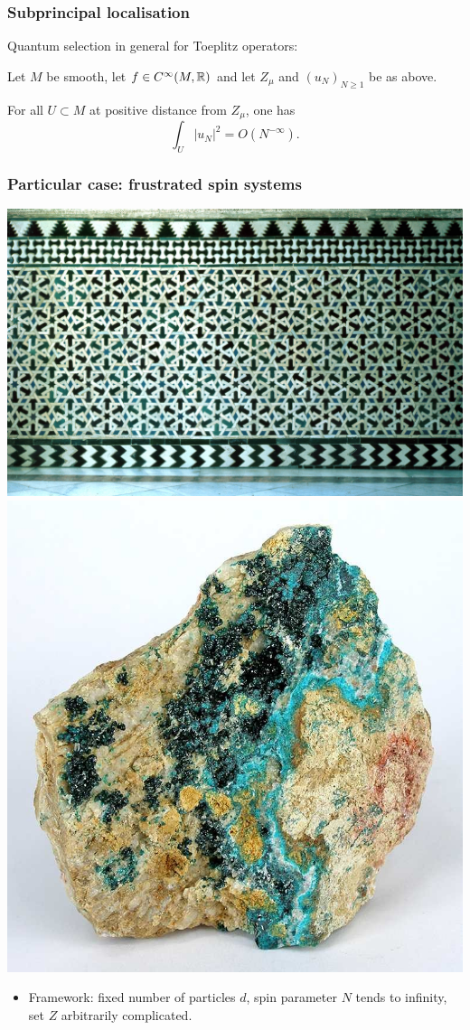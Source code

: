 \documentclass[mathserif]{beamer}
\newcommand{\mycite}[1]{{\color{mygreen} \small #1}}
\begin{document}
\begin{frame}
  \frametitle{Subprincipal localisation}
  Quantum selection in general for Toeplitz operators:
  \begin{theorem}[\mycite{[\underline{D. 2020a}]}]
    Let $M$ be smooth, let $f\in C^{\infty}(M,\mathbb{R})$ and let $Z_{\mu}$ and
    $(u_N)_{N\geq 1}$ be as above.

    For all $U\subset M$ at positive distance from $Z_{\mu}$, one has
    \[
      \int_U
      |u_N|^2=O(N^{-\infty}).
      \]
  \end{theorem}
\end{frame}

\begin{frame}
  \frametitle{Particular case: frustrated spin systems}
  \begin{center}
    \includegraphics[scale=6]{Alcazar.png}\includegraphics[scale=0.16]{Herbertsmithite.jpg}
  \end{center}
  \begin{itemize}
\item  Framework: fixed number of particles $d$, spin parameter $N$
  tends to infinity, set $Z$ arbitrarily complicated.


\end{itemize}
\end{frame}
\end{document}
